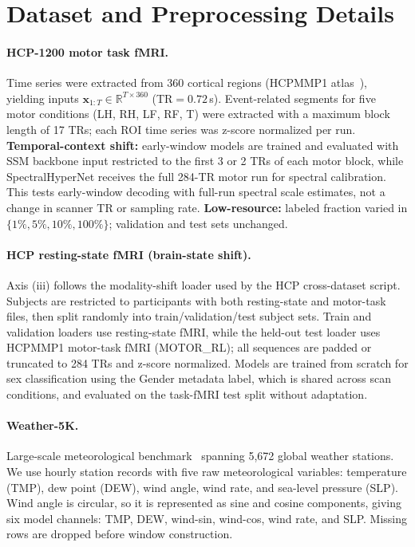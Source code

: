 \documentclass{article}
\begin{document}
\section{Dataset and Preprocessing Details}
\label{sec:appx:data}

\paragraph{HCP-1200 motor task fMRI.}
Time series were extracted from 360 cortical regions (HCPMMP1 atlas~\citep{glasser2016multi}), yielding inputs $\mathbf{x}_{1:T}\in\mathbb{R}^{T\times360}$ (TR$=0.72$\,s).
Event-related segments for five motor conditions (LH, RH, LF, RF, T) were extracted with a maximum block length of 17 TRs; each ROI time series was z-score normalized per run.
\textbf{Temporal-context shift:} early-window models are trained and evaluated with SSM backbone input restricted to the first 3 or 2 TRs of each motor block, while SpectralHyperNet receives the full 284-TR motor run for spectral calibration. This tests early-window decoding with full-run spectral scale estimates, not a change in scanner TR or sampling rate.
\textbf{Low-resource:} labeled fraction varied in $\{1\%, 5\%, 10\%, 100\%\}$; validation and test sets unchanged.

\paragraph{HCP resting-state fMRI (brain-state shift).}
Axis (iii) follows the modality-shift loader used by the HCP cross-dataset script. Subjects are restricted to participants with both resting-state and motor-task files, then split randomly into train/validation/test subject sets. Train and validation loaders use resting-state fMRI, while the held-out test loader uses HCPMMP1 motor-task fMRI (MOTOR\_RL); all sequences are padded or truncated to 284 TRs and z-score normalized. Models are trained from scratch for sex classification using the Gender metadata label, which is shared across scan conditions, and evaluated on the task-fMRI test split without adaptation.

\paragraph{Weather-5K.}
Large-scale meteorological benchmark~\citep{han2024far} spanning 5,672 global weather stations.
We use hourly station records with five raw meteorological variables: temperature (TMP), dew point (DEW), wind angle, wind rate, and sea-level pressure (SLP). Wind angle is circular, so it is represented as sine and cosine components, giving six model channels: TMP, DEW, wind-sin, wind-cos, wind rate, and SLP. Missing rows are dropped before window construction.
\end{document}
